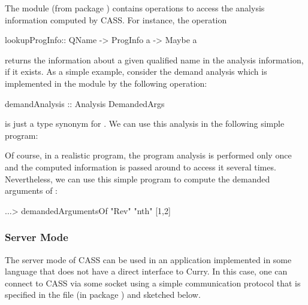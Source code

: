 The module  (from package )
contains operations to access the analysis information computed by CASS.
For instance, the operation
\begin{curry}
lookupProgInfo:: QName -> ProgInfo a -> Maybe a
\end{curry}
returns the information about a given qualified name in the
analysis information, if it exists.
As a simple example, consider the demand analysis which is implemented
in the module  by the following operation:
\begin{curry}
demandAnalysis :: Analysis DemandedArgs
\end{curry}
 is just a type synonym for \code{[Int]}.
We can use this analysis in the following simple program:
Of course, in a realistic program, the program analysis
is performed only once and the computed information 
is passed around to access it several times.
Nevertheless, we can use this simple program to compute the
demanded arguments of :
\begin{curry}
$\ldots$> demandedArgumentsOf "Rev" "nth"
[1,2]
\end{curry}


\subsubsection{Server Mode}

The server mode of CASS can be used in an application implemented in
some language that does not have a direct interface to Curry.
In this case, one can connect to CASS via
some socket using a simple communication protocol that is specified
in the file  (in package )
and sketched below.

